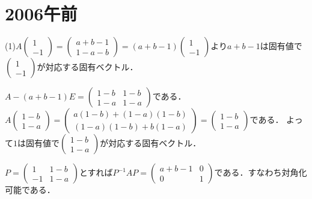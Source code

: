 \documentclass[
		book,
		head_space=20mm,
		foot_space=20mm,
		gutter=10mm,
		line_length=190mm
]{jlreq}
\begin{document}
\section{2006午前}
(1)$A\begin{pmatrix}
1\\-1
\end{pmatrix}=\begin{pmatrix}
a+b-1\\1-a-b
\end{pmatrix}=(a+b-1)\begin{pmatrix}
1\\-1
\end{pmatrix}$より$a+b-1$は固有値で$\begin{pmatrix}
1\\-1
\end{pmatrix}$が対応する固有ベクトル．

$A-(a+b-1)E=\begin{pmatrix}
1-b&1-b\\
1-a&1-a
\end{pmatrix}$である．
$A\begin{pmatrix}
1-b\\1-a
\end{pmatrix}=\begin{pmatrix}
a(1-b)+(1-a)(1-b)\\(1-a)(1-b)+b(1-a)
\end{pmatrix}=\begin{pmatrix}
1-b\\1-a
\end{pmatrix}$である．
よって$1$は固有値で$\begin{pmatrix}
1-b\\1-a
\end{pmatrix}$が対応する固有ベクトル．

$P=\begin{pmatrix}
1&1-b\\
-1&1-a
\end{pmatrix}$とすれば$P^{-1}AP=\begin{pmatrix}
a+b-1&0\\
0&1
\end{pmatrix}$である．すなわち対角化可能である．
\end{document}
